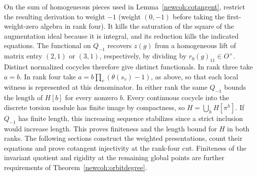 On the sum of homogeneous pieces used in Lemma~\ref{newcoh:cotangent},
restrict the resulting derivation to weight \(-1\) (weight \((0,-1)\)
before taking the first-weight-zero algebra in rank four). It kills
the saturation of the square of the augmentation ideal because it
is integral, and its reduction kills the indicated equations.
The functional on \(Q_{-1}\) recovers \(z(g)\) from a homogeneous
lift of matrix entry \((2,1)\) or \((3,1)\), respectively, by dividing
by \(r_0(g)_{11}\in O^\times\). Distinct normalized cocycles therefore
give distinct functionals. In rank three take \(a=b\). In rank four
take \(a=b\prod_v(\theta(s_v)-1)\), as above, so that each local
witness is represented at this denominator. In either rank the same
\(Q_{-1}\) bounds the length of \(H[b]\) for every nonzero \(b\).
Every continuous cocycle into the discrete torsion module has finite
image by compactness, so \(H=\bigcup_hH[\pi^h]\). If \(Q_{-1}\)
has finite length, this increasing sequence stabilizes since a strict
inclusion would increase length. This proves finiteness and the
length bound for \(H\) in both ranks. The following sections construct the weighted presentations, count their
equations and prove cotangent injectivity at the rank-four cut.
Finiteness of the invariant quotient and rigidity at the remaining
global points are further requirements of Theorem~\ref{newcoh:orbitdegree}.
